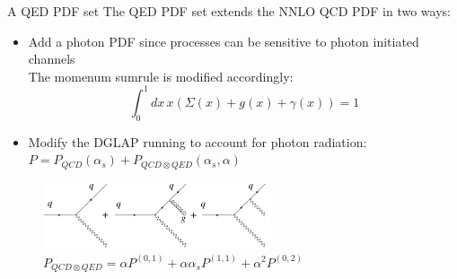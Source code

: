 \documentclass[8pt,t]{beamer}
\begin{document}
\begin{frame}{A QED PDF set}
  The QED PDF set extends the NNLO QCD PDF in two ways:
  \begin{itemize}
    \item Add a photon PDF since processes can be sensitive to photon initiated channels \\
    The momenum sumrule is modified accordingly:
    \begin{equation*}
      \int_0^1 dx\, x \left(  \Sigma(x) + g(x) + \gamma(x) \right) =1
    \end{equation*}


    \item Modify the DGLAP running to account for photon radiation: \\
    $P=P_{QCD}(\alpha_s) + P_{QCD\otimes QED}(\alpha_s,\alpha)$\\
  \end{itemize}

  \begin{figure}
    \includegraphics[width=0.6\textwidth]{qed_splitting.png}
    \caption*{$P_{QCD\otimes QED}=\alpha P^{(0,1)}+\alpha \alpha_s P^{(1,1)}+\alpha^2 P^{(0,2)}$}
  \end{figure}

\end{frame}
\end{document}
